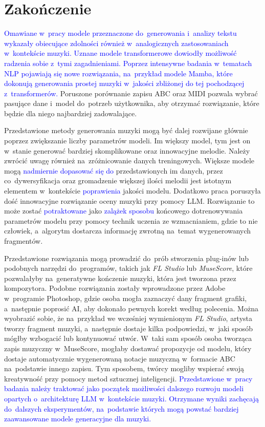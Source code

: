 \documentclass[data-science]{agh-wi} %
\begin{document}
\chapter{Zakończenie}

\textcolor{blue}{Omawiane w~pracy modele przeznaczone do~generowania i~analizy tekstu wykazały obiecujące zdolności również w~analogicznych zastosowaniach w~kontekście muzyki. Uznane modele transformerowe dowiodły możliwość radzenia sobie z~tymi zagadnieniami. Poprzez intensywne badania w~tematach NLP pojawiają się nowe rozwiązania, na~przykład modele Mamba, które dokonują generowania prostej muzyki w~jakości zbliżonej do tej pochodzącej z~transformerów.} Poruszone porównanie zapisu ABC oraz MIDI pozwala wybrać pasujące dane i~model do~potrzeb użytkownika, aby otrzymać rozwiązanie, które będzie dla niego najbardziej zadowalające.

Przedstawione metody generowania muzyki mogą być dalej rozwijane głównie poprzez zwiększanie liczby parametrów modeli. Im większy model, tym jest on w~stanie generować bardziej skomplikowane oraz innowacyjne melodie. Należy zwrócić uwagę również na~zróżnicowanie danych treningowych. Większe modele mogą \textcolor{blue}{nadmiernie dopasować się do} przedstawionych im danych, przez co~dywersyfikacja oraz gromadzenie większej ilości melodii jest istotnym elementem w~kontekście \textcolor{blue}{poprawienia} jakości modelu. Dodatkowo praca poruszyła dość innowacyjne rozwiązanie oceny muzyki przy pomocy LLM. Rozwiązanie to może zostać \textcolor{blue}{potraktowane} jako \textcolor{blue}{zalążek sposobu} końcowego dotrenowywania parametrów modelu przy pomocy technik uczenia ze wzmacnianiem, gdzie to nie człowiek, a~algorytm dostarcza informację zwrotną na~temat wygenerowanych fragmentów.

Przedstawione rozwiązania mogą prowadzić do~prób stworzenia plug-inów lub podobnych narzędzi do~programów, takich jak \textit{FL Studio} lub \textit{MuseScore}, które pozwalałyby na~generatywne kończenie muzyki, która jest tworzona przez kompozytora. Podobne rozwiązania zostały wprowadzone przez Adobe w~programie Photoshop, gdzie osoba mogła zaznaczyć dany fragment grafiki, a~następnie poprosić AI, aby dokonało pewnych korekt według polecenia. Można wyobrazić sobie, że na~przykład we wcześniej wymienionym \textit{FL Studio}, artysta tworzy fragment muzyki, a~następnie dostaje kilka podpowiedzi, w~jaki sposób mógłby wzbogacić lub kontynuować utwór. W~taki sam sposób osoba tworząca zapis muzyczny w~MuseScore, mogłaby dostawać propozycje od modelu, który dostaje automatycznie wygenerowaną notacje muzyczną w~formacie ABC na~podstawie innego zapisu. Tym sposobem, twórcy mogliby wspierać swoją kreatywność przy pomocy metod sztucznej inteligencji. \textcolor{blue}{Przedstawione w~pracy badania należy traktować jako początek możliwości dalszego rozwoju modeli opartych o~architekturę LLM w~kontekście muzyki. Otrzymane wyniki zachęcają do~dalszych eksperymentów, na~podstawie których mogą powstać bardziej zaawansowane modele generacyjne dla muzyki.}
\end{document}
